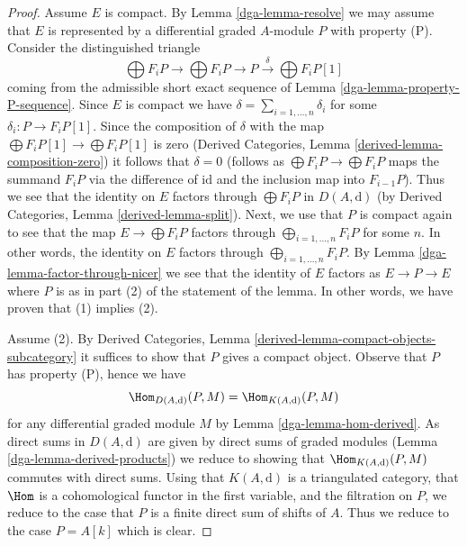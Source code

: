 \begin{proof}

Assume $E$ is compact. By Lemma \ref{dga-lemma-resolve} we may assume that $E$
is represented by a differential graded $A$-module $P$ with property (P).
Consider the distinguished triangle
$$
\bigoplus F_iP \to \bigoplus F_iP \to P
\xrightarrow{\delta} \bigoplus F_iP[1]
$$
coming from the admissible short exact sequence of
Lemma \ref{dga-lemma-property-P-sequence}. Since $E$ is compact we have
$\delta = \sum_{i = 1, \ldots, n} \delta_i$ for some
$\delta_i : P \to F_iP[1]$. Since the composition of $\delta$
with the map $\bigoplus F_iP[1] \to \bigoplus F_iP[1]$ is zero
(Derived Categories, Lemma \ref{derived-lemma-composition-zero})
it follows that $\delta = 0$ (follows as $\bigoplus F_iP \to \bigoplus F_iP$
maps the summand $F_iP$ via the difference of $\text{id}$ and the inclusion
map into $F_{i - 1}P$).
Thus we see that the identity on $E$ factors through
$\bigoplus F_iP$ in $D(A, \text{d})$ (by
Derived Categories, Lemma \ref{derived-lemma-split}).
Next, we use that $P$ is compact again to see that the map
$E \to \bigoplus F_iP$ factors through $\bigoplus_{i = 1, \ldots, n} F_iP$
for some $n$. In other words, the identity on $E$ factors through
$\bigoplus_{i = 1, \ldots, n} F_iP$. By
Lemma \ref{dga-lemma-factor-through-nicer}
we see that the identity of $E$ factors as $E \to P \to E$
where $P$ is as in part (2) of the statement of the lemma.
In other words, we have proven that (1) implies (2).

\medskip\noindent
Assume (2). By
Derived Categories, Lemma \ref{derived-lemma-compact-objects-subcategory}
it suffices to show that $P$ gives a compact object. Observe that
$P$ has property (P), hence we have
$$
\Hom_{D(A, \text{d})}(P, M) = \Hom_{K(A, \text{d})}(P, M)
$$
for any differential graded module $M$ by Lemma \ref{dga-lemma-hom-derived}.
As direct sums in $D(A, \text{d})$ are given by direct sums of
graded modules (Lemma \ref{dga-lemma-derived-products}) we reduce
to showing that $\Hom_{K(A, \text{d})}(P, M)$ commutes with direct
sums. Using that $K(A, \text{d})$ is a triangulated category,
that $\Hom$ is a cohomological functor in the first
variable, and the filtration on $P$, we reduce to the case that
$P$ is a finite direct sum of shifts of $A$. Thus we reduce to
the case $P = A[k]$ which is clear.
\end{proof}

